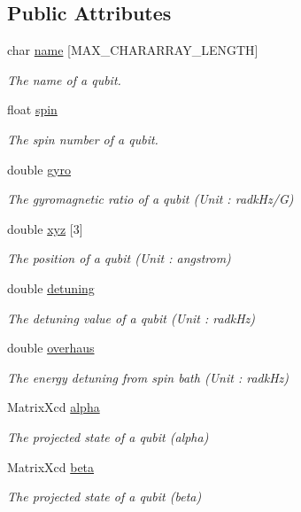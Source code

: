 \subsection*{Public Attributes}
\begin{DoxyCompactItemize}
\item 
char \hyperlink{structQubit_ab65a0dfa0efbd8a7862403f4704c1587}{name} \mbox{[}M\-A\-X\-\_\-\-C\-H\-A\-R\-A\-R\-R\-A\-Y\-\_\-\-L\-E\-N\-G\-T\-H\mbox{]}
\begin{DoxyCompactList}\small\item\em The name of a qubit. \end{DoxyCompactList}\item 
float \hyperlink{structQubit_a858930b7d9d9cafc70f26ab7993dadad}{spin}
\begin{DoxyCompactList}\small\item\em The spin number of a qubit. \end{DoxyCompactList}\item 
double \hyperlink{structQubit_a668a62d3ddf72e6b9acbc6338c97090f}{gyro}
\begin{DoxyCompactList}\small\item\em The gyromagnetic ratio of a qubit (Unit \-: radk\-Hz/\-G) \end{DoxyCompactList}\item 
double \hyperlink{structQubit_a799cb32b473160eb8e9e4aa6c9c39b18}{xyz} \mbox{[}3\mbox{]}
\begin{DoxyCompactList}\small\item\em The position of a qubit (Unit \-: angstrom) \end{DoxyCompactList}\item 
double \hyperlink{structQubit_a6e0e926587994ef24d67431d0dbef9e7}{detuning}
\begin{DoxyCompactList}\small\item\em The detuning value of a qubit (Unit \-: radk\-Hz) \end{DoxyCompactList}\item 
double \hyperlink{structQubit_aecb3943042094c4be043f375626dbd24}{overhaus}
\begin{DoxyCompactList}\small\item\em The energy detuning from spin bath (Unit \-: radk\-Hz) \end{DoxyCompactList}\item 
Matrix\-Xcd \hyperlink{structQubit_accc3b309d802ab6f269b7d8a7536a4a0}{alpha}
\begin{DoxyCompactList}\small\item\em The projected state of a qubit (alpha) \end{DoxyCompactList}\item 
Matrix\-Xcd \hyperlink{structQubit_a6c73eb8c49fdb6db06179b21b5a2923d}{beta}
\begin{DoxyCompactList}\small\item\em The projected state of a qubit (beta) \end{DoxyCompactList}\end{DoxyCompactItemize}


